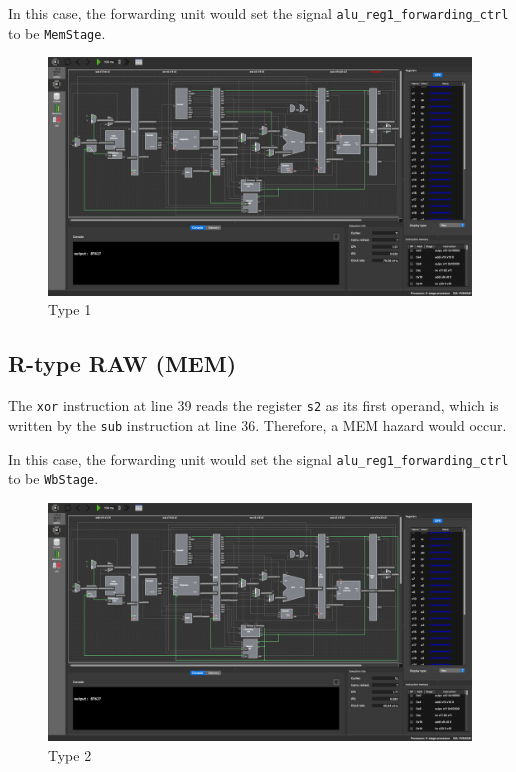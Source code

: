 \documentclass[12pt, a4paper]{article}
\begin{document}
In this case, the forwarding unit would set the signal \texttt{alu\_reg1\_forwarding\_ctrl} to be \texttt{MemStage}.

\begin{figure}[htbp]
\centering
\includegraphics[width=\linewidth]{1}
\caption{Type 1}
\label{fig:1}
\end{figure}

\pagebreak[4]

\subsection{R-type RAW (MEM)}

The \texttt{xor} instruction at line 39 reads the register \texttt{s2} as its first operand, which is written by the \texttt{sub} instruction at line 36. Therefore, a MEM hazard would occur.

In this case, the forwarding unit would set the signal \texttt{alu\_reg1\_forwarding\_ctrl} to be \texttt{WbStage}.

\begin{figure}[htbp]
\centering
\includegraphics[width=\linewidth]{2}
\caption{Type 2}
\label{fig:2}
\end{figure}
\end{document}

